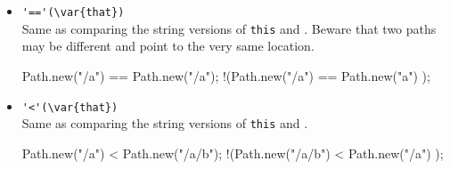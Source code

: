 \begin{itemize}
\item \lstinline|'=='(\var{that})|\\
  Same as comparing the string versions of \lstinline|this| and
  .  Beware that two paths may be different and point to the
  very same location.
\begin{urbiassert}
  Path.new("/a")  == Path.new("/a");
!(Path.new("/a")  == Path.new("a")  );
\end{urbiassert}

\item \lstinline|'<'(\var{that})|\\
  Same as comparing the string versions of \lstinline|this| and
  .
\begin{urbiassert}
  Path.new("/a")   < Path.new("/a/b");
!(Path.new("/a/b") < Path.new("/a")  );
\end{urbiassert}

\end{itemize}


